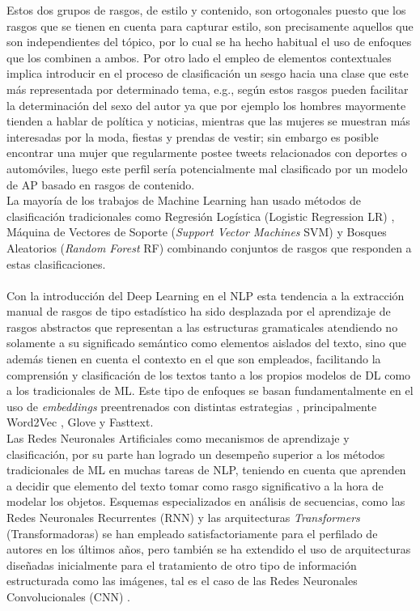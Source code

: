 Estos dos grupos de rasgos, de estilo y contenido, son ortogonales puesto que los rasgos que se tienen en cuenta para capturar estilo, son precisamente aquellos que son independientes del tópico, por lo cual se ha hecho habitual el uso de enfoques que los combinen a ambos. Por otro lado el empleo de elementos contextuales implica introducir en el proceso de clasificación un sesgo hacia una clase que este más representada por determinado tema, e.g., según \citep{schler2006effects} estos rasgos pueden facilitar la determinación del sexo del autor ya que por ejemplo los hombres mayormente tienden a hablar de política y noticias, mientras que las mujeres se muestran más interesadas por la moda, fiestas y prendas de vestir; sin embargo es posible encontrar una mujer que regularmente postee tweets relacionados con deportes o automóviles, luego este perfil sería potencialmente mal clasificado por un modelo de AP basado en rasgos de contenido.
\\
La mayoría de los trabajos de Machine Learning han usado métodos de clasificación tradicionales como Regresión Logística (Logistic Regression LR) \citep{DBLP:conf/clef/Valencia-Valencia19}, Máquina de Vectores de Soporte (\textit{Support Vector Machines} SVM) \citep{DBLP:conf/clef/Pizarro19}  y Bosques Aleatorios (\textit{Random Forest} RF) \citep{DBLP:conf/clef/Johansson19} combinando conjuntos de rasgos que responden a estas clasificaciones.
\\
\\
 Con la introducción del Deep Learning en el NLP esta tendencia a la extracción manual de rasgos de tipo estadístico ha sido desplazada por el aprendizaje de rasgos abstractos que representan a las estructuras gramaticales atendiendo no solamente a su significado semántico como elementos aislados del texto, sino que además tienen en cuenta el contexto en el que son empleados, facilitando la comprensión y clasificación de los textos tanto a los propios modelos de DL como a los tradicionales de ML. Este tipo de enfoques se basan fundamentalmente en el uso de \textit{embeddings} preentrenados con distintas estrategias \citep{DBLP:conf/clef/JooH19,DBLP:conf/clef/Lopez-Santillan19}, principalmente Word2Vec \citep{DBLP:conf/nips/MikolovSCCD13}, Glove\citep{pennington2014glove} y Fasttext\citep{bojanowski2016enriching}.
 \\
 Las Redes Neuronales Artificiales como mecanismos de aprendizaje y clasificación, por su parte han logrado un desempeño superior a los métodos tradicionales de ML en muchas tareas de NLP, teniendo en cuenta que aprenden a decidir que elemento del texto tomar como rasgo significativo a la hora de modelar los objetos. Esquemas especializados en análisis de secuencias, como las Redes Neuronales Recurrentes (RNN) \citep{DBLP:conf/clef/DiasP19,bakhteev:2020} y las arquitecturas \textit{Transformers} (Transformadoras) \citep{iyer:2020,baruah:2020} se han empleado satisfactoriamente para el perfilado de autores en los últimos años, pero también se ha extendido el uso de arquitecturas diseñadas inicialmente para el tratamiento de otro tipo de información estructurada como las imágenes, tal es el caso de las Redes Neuronales Convolucionales (CNN) \citep{DBLP:conf/clef/PetrikC19,DBLP:conf/clef/Lopez-Santillan19}.

